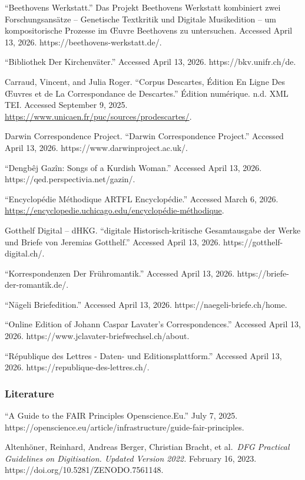 \documentclass[
  letterpaper,
  DIV=11,
  numbers=noendperiod]{scrreprt}
\begin{document}
``Beethovens Werkstatt.'' Das Projekt Beethovens Werkstatt kombiniert
zwei Forschungsansätze -- Genetische Textkritik und Digitale
Musikedition -- um kompositorische Prozesse im Œuvre Beethovens zu
untersuchen. Accessed April 13, 2026. https://beethovens-werkstatt.de/.

``Bibliothek Der Kirchenväter.'' Accessed April 13, 2026.
https://bkv.unifr.ch/de.

Carraud, Vincent, and Julia Roger. ``Corpus Descartes, Édition En Ligne
Des Œuvres et de La Correspondance de Descartes.'' Édition numérique.
n.d. XML TEI. Accessed September 9, 2025.
\url{https://www.unicaen.fr/puc/sources/prodescartes/}.

Darwin Correspondence Project. ``Darwin Correspondence Project.''
Accessed April 13, 2026. https://www.darwinproject.ac.uk/.

``Dengbêj Gazîn: Songs of a Kurdish Woman.'' Accessed April 13, 2026.
https://qed.perspectivia.net/gazin/.

``Encyclopédie Méthodique \textbar{} ARTFL Encyclopédie.'' Accessed
March 6, 2026.
\url{https://encyclopedie.uchicago.edu/encyclopédie-méthodique}.

Gotthelf Digital -- dHKG. ``digitale Historisch-kritische Gesamtausgabe
der Werke und Briefe von Jeremias Gotthelf.'' Accessed April 13, 2026.
https://gotthelf-digital.ch/.

``Korrespondenzen Der Frühromantik.'' Accessed April 13, 2026.
https://briefe-der-romantik.de/.

``Nägeli Briefedition.'' Accessed April 13, 2026.
https://naegeli-briefe.ch/home.

``Online Edition of Johann Caspar Lavater's Correspondences.'' Accessed
April 13, 2026. https://www.jclavater-briefwechsel.ch/about.

``République des Lettres - Daten- und Editionsplattform.'' Accessed
April 13, 2026. https://republique-des-lettres.ch/.

\subsubsection{Literature}\label{literature}

``A Guide to the FAIR Principles \textbar{} Openscience.Eu.'' July 7,
2025.
https://openscience.eu/article/infrastructure/guide-fair-principles.

Altenhöner, Reinhard, Andreas Berger, Christian Bracht, et al.~\emph{DFG
Practical Guidelines on Digitisation. Updated Version 2022.} February
16, 2023. https://doi.org/10.5281/ZENODO.7561148.
\end{document}
